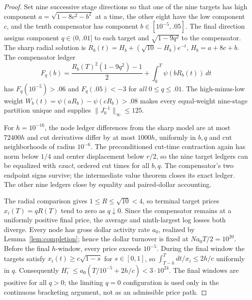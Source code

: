 \documentclass[review,hidelinks,onefignum,onetabnum]{siamonline250211}%
\begin{document}
\begin{proof}
Set nine successive stage directions so that one of the nine
targets has high component
$a=\sqrt{1-8c^2-b^2}$ at a time, the other eight have the
low component $c$, and the tenth compensator has component
$b\in[10^{-5},.05]$. The final direction assigns component
$q\in(0,.01]$ to each target and
$\sqrt{1-9q^2}$ to the compensator.
The sharp radial solution is
$R_b(t)=H_b+(\sqrt{10}-H_b)e^{-t}$,
$H_b=a+8c+b$. The compensator ledger
\[
 F_q(b)=\frac{R_b(T)^2(1-9q^2)-1}{2}
     +\int_0^T\psi(bR_b(t))\,dt
\]
has $F_q(10^{-5})>.06$ and $F_q(.05)<-3$ for \emph{all}
$0\le q\le.01$. The high-minus-low weight
$W_b(t)=\psi(aR_b)-\psi(cR_b)>.08$ makes every equal-weight
nine-stage partition unique and supplies
$\|J_0^{-1}\|_\infty\le125$.

For $h=10^{-16}$, the node ledger differences from the sharp
model are at most $72400h$ and cut derivatives differ by at most
$1000h$, uniformly in $b,q$ and cut neighborhoods of radius
$10^{-6}$. The preconditioned cut-time contraction again has
norm below $1/4$ and center displacement below $r/2$, so the
nine target ledgers can be equalized with \emph{exact}, ordered
cut times for all $b,q$. The compensator's two endpoint signs
survive; the intermediate value theorem closes its exact ledger.
The other nine ledgers close by equality and paired-dollar
accounting.

The radial comparison gives $1\le R\le\sqrt{10}<4$,
so terminal target prices $x_i(T)=qR(T)$ tend to zero as
$q\downarrow0$. Since the compensator remains at a uniformly
positive final price, the average and ninth-largest log losses
both diverge. Every node has gross dollar activity rate $a_0$,
realized by Lemma~\ref{lem:completion}; hence the dollar turnover
is fixed at $Na_0T/2=10^{20}$.
Before the final $h$-window, every price exceeds $10^{-5}$.
During the final window the targets satisfy
$x_i(t)\ge c\sqrt{1-s}$ for $s\in[0,1]$, so
$\int_{T-h}^T dt/x_i\le2h/c$ uniformly in $q$.
Consequently
$H_i^-\le a_0(T/10^{-5}+2h/c)<3\cdot10^{24}$.
The final windows are positive for all $q>0$; the limiting
$q=0$ configuration is used only in the continuous bracketing
argument, not as an admissible price path.
\end{proof}
\end{document}
